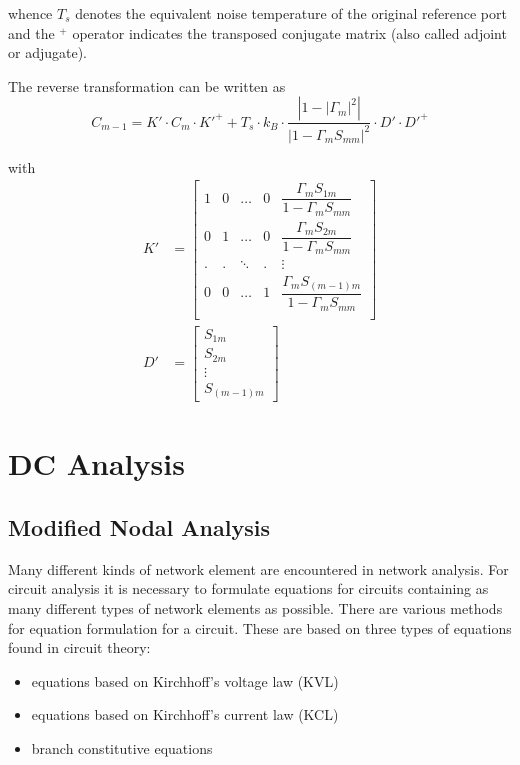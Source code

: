 \documentclass[10pt]{report}
\begin{document}
whence $T_s$ denotes the equivalent noise temperature of the original
reference port and the $ ^{+}$ operator indicates the transposed
conjugate matrix (also called adjoint or adjugate).

\addvspace{12pt}

The reverse transformation can be written as
\begin{equation}
C_{m-1} = K'\cdot C_m\cdot K'^+ +T_s\cdot k_B \cdot\dfrac{\left|1 - \left|\Gamma_m\right|^2\right|}{\left|1 - \Gamma_m S_{mm}\right|^2}\cdot D'\cdot D'^+
\end{equation}

with
\begin{align}
K' &=
\begin{bmatrix}
1 & 0 & \ldots & 0 & \dfrac{\Gamma_m S_{1m}}{1 - \Gamma_m S_{mm}}\\
0 & 1 & \ldots & 0 & \dfrac{\Gamma_m S_{2m}}{1 - \Gamma_m S_{mm}}\\
. & . & \ddots & . & \vdots\\
0 & 0 & \ldots & 1 & \dfrac{\Gamma_m S_{(m-1)m}}{1 - \Gamma_m S_{mm}}\\
\end{bmatrix}\\
D' &=
\begin{bmatrix}
S_{1m}\\
S_{2m}\\
\vdots\\
S_{(m-1)m}
\end{bmatrix}
\end{align}

\chapter{DC Analysis}

\section{Modified Nodal Analysis}

Many different kinds of network element are encountered in network
analysis.  For circuit analysis it is necessary to formulate equations
for circuits containing as many different types of network elements as
possible.  There are various methods for equation formulation for a
circuit.  These are based on three types of equations found in circuit
theory:

\begin{itemize}
\item equations based on Kirchhoff's voltage law (KVL)
\item equations based on Kirchhoff's current law (KCL)
\item branch constitutive equations
\end{itemize}
\end{document}
